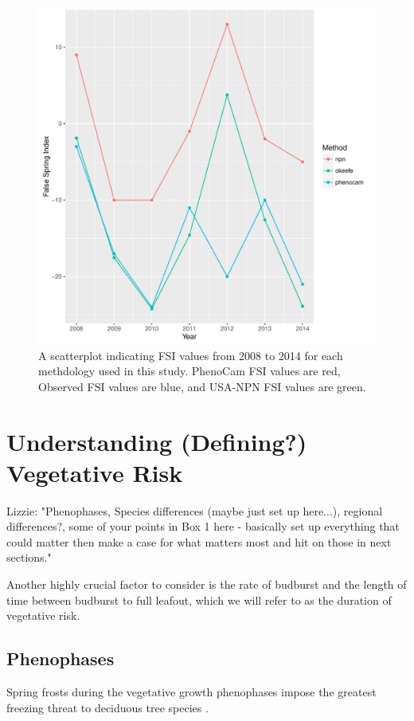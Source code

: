 \documentclass{article}\usepackage[]{graphicx}\usepackage[]{color}
\makeatletter
\def\maxwidth{ %
  \ifdim\Gin@nat@width>\linewidth
    \linewidth
  \else
    \Gin@nat@width
  \fi
}
\makeatother
\begin{document}
\begin{figure}[H]
\includegraphics[width=\maxwidth]{figure/fsifig-1} \caption[A scatterplot indicating FSI values from 2008 to 2014 for each methdology used in this study]{A scatterplot indicating FSI values from 2008 to 2014 for each methdology used in this study. PhenoCam FSI values are red, Observed FSI values are blue, and USA-NPN FSI values are green.}\label{fig:fsifig}
\end{figure}



\section*{Understanding (Defining?) Vegetative Risk}
Lizzie: "Phenophases, Species differences (maybe just set up here...), regional differences?, some of your points in Box 1 here - basically set up everything that could matter then make a case for what matters most and hit on those in next sections."

Another highly crucial factor to consider is the rate of budburst and the length of time between budburst to full leafout, which we will refer to as the duration of vegetative risk.

\subsection*{Phenophases}
Spring frosts during the vegetative growth phenophases impose the greatest freezing threat to deciduous tree species \citep{Sakai1987}.
\end{document}
